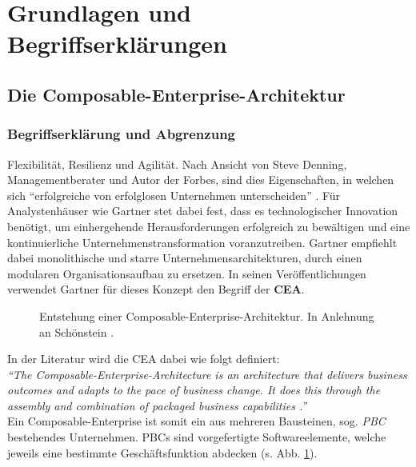 \section{Grundlagen und Begriffserklärungen}

\subsection{Die Composable-Enterprise-Architektur}

\subsubsection{Begriffserklärung und Abgrenzung}
\label{sec:CEA_B}
Flexibilität, Resilienz und Agilität. Nach Ansicht von Steve Denning, Managementberater und Autor der Forbes, sind dies Eigenschaften, in welchen sich \enquote{erfolgreiche von erfolglosen Unternehmen unterscheiden} \cite{Denning.20170210}. Für Analystenhäuser wie Gartner stet dabei fest, dass es technologischer Innovation benötigt, um einhergehende Herausforderungen erfolgreich zu bewältigen und eine kontinuierliche Unternehmenstransformation voranzutreiben. Gartner empfiehlt dabei monolithische und starre Unternehmensarchitekturen, durch einen modularen Organisationsaufbau zu ersetzen. In seinen Veröffentlichungen verwendet Gartner für dieses Konzept den Begriff der \textbf{\ac{CEA}}.
\begin{center}
	\begin{figure}[H]
		\centering
		\caption[Entstehung einer Composable-Enterprise-Architektur]{Entstehung einer Composable-Enterprise-Architektur. In Anlehnung an Schönstein \cite{Schonenstein.20230103}.}
		\label{fig:CEA}
	\end{figure}	
\end{center}
\vspace*{-15mm}
In der Literatur wird die CEA dabei wie folgt definiert:\vspace{2mm}\\
\textit{\enquote{The Composable-Enterprise-Architecture is an architecture that delivers business outcomes and adapts to the pace of business change. It does this through the assembly and combination of packaged business capabilities \cite{.20230313}.}}\vspace{2mm}\\
Ein Composable-Enterprise ist somit ein aus mehreren Bausteinen, sog. \textit{\ac{PBC}} bestehendes Unternehmen. PBCs sind vorgefertigte Softwareelemente, welche jeweils eine bestimmte Geschäftsfunktion abdecken (s. Abb. \ref{fig:CEA}).
